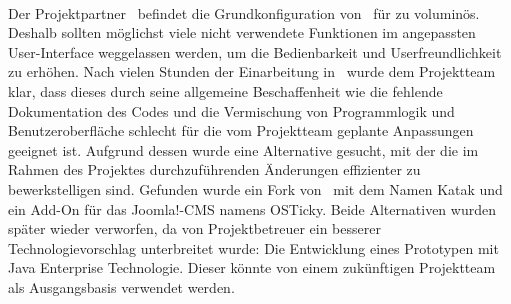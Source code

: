 \paragraph{}
Der Projektpartner \getHammerl\ befindet die Grundkonfiguration von \getOst\ für zu voluminös. Deshalb sollten möglichst viele nicht verwendete Funktionen im angepassten User-Interface weggelassen werden, um die Bedienbarkeit und Userfreundlichkeit zu erhöhen.\newline
Nach vielen Stunden der Einarbeitung in \getOst\ wurde dem Projektteam klar, dass dieses durch seine allgemeine Beschaffenheit wie die fehlende Dokumentation des Codes und die Vermischung von Programmlogik und Benutzeroberfläche schlecht für die vom Projektteam geplante Anpassungen geeignet ist. Aufgrund dessen wurde eine Alternative gesucht, mit der die im Rahmen des Projektes durchzuführenden Änderungen effizienter zu bewerkstelligen sind. Gefunden wurde ein Fork von \getOst\ mit dem Namen Katak und ein Add-On für das \glqq Joomla!\grqq-CMS namens \glqq OSTicky\grqq. Beide Alternativen wurden später wieder verworfen, da von Projektbetreuer \getSteff ein besserer Technologievorschlag unterbreitet wurde: Die Entwicklung eines Prototypen mit Java Enterprise Technologie. Dieser könnte von einem zukünftigen Projektteam als Ausgangsbasis verwendet werden.


